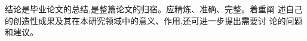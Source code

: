 \begin{conclusion}
  结论是毕业论文的总结,是整篇论文的归宿。应精炼、准确、完整。着重阐
  述自己的创造性成果及其在本研究领域中的意义、作用,还可进一步提出需要讨
  论的问题和建议。
\end{conclusion}